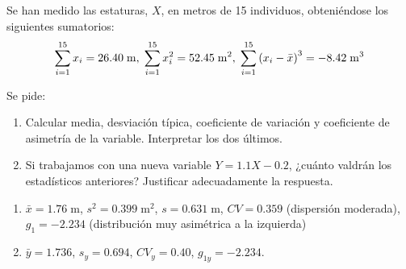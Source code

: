 {Se han medido las estaturas, $X$, en metros de 15 individuos, obteniéndose los siguientes sumatorios:
\[
\sum\limits_{i = 1}^{15} {x_i  = 26.40\;} {\rm m}{\rm ,}\;\sum\limits_{i = 1}^{15} {x^2 _i  = 52.45\;{\rm m}^{\rm 2} } ,\;\sum\limits_{i = 1}^{15} {\left( {x_i  - \bar x} \right)^3 }  =  - 8.42\;{\rm m}^3
\]

Se pide:
\begin{enumerate}
\item Calcular media, desviación típica, coeficiente de variación y coeficiente de asimetría de la variable. Interpretar los dos últimos.
\item Si trabajamos con una nueva variable $Y=1.1X-0.2$, ¿cuánto valdrán los estadísticos anteriores? Justificar adecuadamente la respuesta.
\end{enumerate}
}
{\begin{enumerate}
\item $\bar x=1.76\; \mbox{m}$, $s^2=0.399\;\mbox{m}^2$, $s=0.631\;\mbox{m}$, $CV=0.359$ (dispersión moderada), $g_1=- 2.234$ (distribución muy asimétrica a la izquierda)
\item $\bar y=1.736$, $s_y=0.694$, $CV_y=0.40$, $g_{1y}=-2.234$.
\end{enumerate}
}
